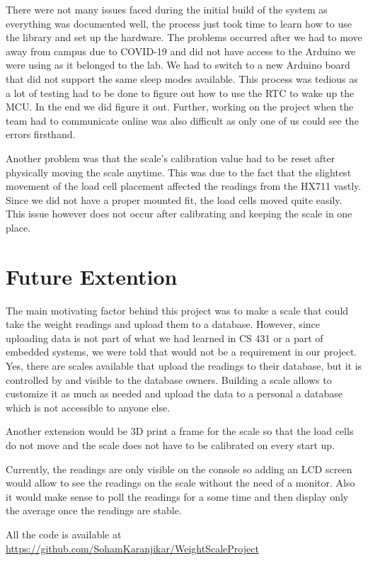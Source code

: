 \documentclass[10pt]{article}
\begin{document}
{\begin{flushleft}
{There were not many issues faced during the initial build of the system as everything was documented well, the process just took time to learn how to use the library and set up the hardware. The problems occurred after we had to move away from campus due to COVID-19 and did not have access to the Arduino we were using as it belonged to the lab. We had to switch to a new Arduino board that did not support the same sleep modes available. This process was tedious as a lot of testing had to be done to figure out how to use the RTC to wake up the MCU. In the end we did figure it out. Further, working on the project when the team had to communicate online was also difficult as only one of us could see the errors firsthand.

Another problem was that the scale's calibration value had to be reset after physically moving the scale anytime. This was due to the fact that the slightest movement of the load cell placement affected the readings from the HX711 vastly. Since we did not have a proper mounted fit, the load cells moved quite easily. This issue however does not occur after calibrating and keeping the scale in one place.
\par}


{\Large \section{Future Extention} \par}
{\large
The main motivating factor behind this project was to make a scale that could take the weight readings and upload them to a database. However, since uploading data is not part of what we had learned in CS 431 or a part of embedded systems, we were told that would not be a requirement in our project. Yes, there are scales available that upload the readings to their database, but it is controlled by and visible to the database owners. Building a scale allows to customize it as much as needed and upload the data to a personal a database which is not accessible to anyone else.

Another extension would be 3D print a frame for the scale so that the load cells do not move and the scale does not have to be calibrated on every start up.

Currently, the readings are only visible on the console so adding an LCD screen would allow to see the readings on the scale without the need of a monitor. Also it would make sense to poll the readings for a some time and then display only the average once the readings are stable.



\par}

All the code is available at \href{https://github.com/SohamKaranjikar/WeightScaleProject}{https://github.com/SohamKaranjikar/WeightScaleProject}
\end{flushleft}}
\end{document}
